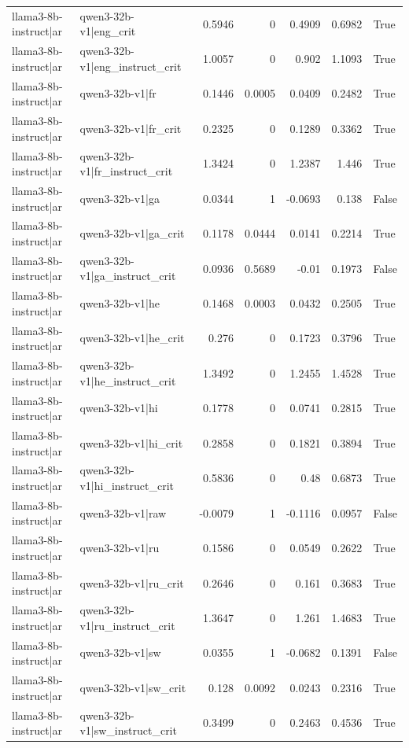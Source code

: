 \begin{table}
\begin{tabular}{l l r r r r l}
llama3-8b-instruct|ar & qwen3-32b-v1|eng_crit & 0.5946 & 0 & 0.4909 & 0.6982 & True \\
llama3-8b-instruct|ar & qwen3-32b-v1|eng_instruct_crit & 1.0057 & 0 & 0.902 & 1.1093 & True \\
llama3-8b-instruct|ar & qwen3-32b-v1|fr & 0.1446 & 0.0005 & 0.0409 & 0.2482 & True \\
llama3-8b-instruct|ar & qwen3-32b-v1|fr_crit & 0.2325 & 0 & 0.1289 & 0.3362 & True \\
llama3-8b-instruct|ar & qwen3-32b-v1|fr_instruct_crit & 1.3424 & 0 & 1.2387 & 1.446 & True \\
llama3-8b-instruct|ar & qwen3-32b-v1|ga & 0.0344 & 1 & -0.0693 & 0.138 & False \\
llama3-8b-instruct|ar & qwen3-32b-v1|ga_crit & 0.1178 & 0.0444 & 0.0141 & 0.2214 & True \\
llama3-8b-instruct|ar & qwen3-32b-v1|ga_instruct_crit & 0.0936 & 0.5689 & -0.01 & 0.1973 & False \\
llama3-8b-instruct|ar & qwen3-32b-v1|he & 0.1468 & 0.0003 & 0.0432 & 0.2505 & True \\
llama3-8b-instruct|ar & qwen3-32b-v1|he_crit & 0.276 & 0 & 0.1723 & 0.3796 & True \\
llama3-8b-instruct|ar & qwen3-32b-v1|he_instruct_crit & 1.3492 & 0 & 1.2455 & 1.4528 & True \\
llama3-8b-instruct|ar & qwen3-32b-v1|hi & 0.1778 & 0 & 0.0741 & 0.2815 & True \\
llama3-8b-instruct|ar & qwen3-32b-v1|hi_crit & 0.2858 & 0 & 0.1821 & 0.3894 & True \\
llama3-8b-instruct|ar & qwen3-32b-v1|hi_instruct_crit & 0.5836 & 0 & 0.48 & 0.6873 & True \\
llama3-8b-instruct|ar & qwen3-32b-v1|raw & -0.0079 & 1 & -0.1116 & 0.0957 & False \\
llama3-8b-instruct|ar & qwen3-32b-v1|ru & 0.1586 & 0 & 0.0549 & 0.2622 & True \\
llama3-8b-instruct|ar & qwen3-32b-v1|ru_crit & 0.2646 & 0 & 0.161 & 0.3683 & True \\
llama3-8b-instruct|ar & qwen3-32b-v1|ru_instruct_crit & 1.3647 & 0 & 1.261 & 1.4683 & True \\
llama3-8b-instruct|ar & qwen3-32b-v1|sw & 0.0355 & 1 & -0.0682 & 0.1391 & False \\
llama3-8b-instruct|ar & qwen3-32b-v1|sw_crit & 0.128 & 0.0092 & 0.0243 & 0.2316 & True \\
llama3-8b-instruct|ar & qwen3-32b-v1|sw_instruct_crit & 0.3499 & 0 & 0.2463 & 0.4536 & True \\

\end{tabular}
\end{table}
